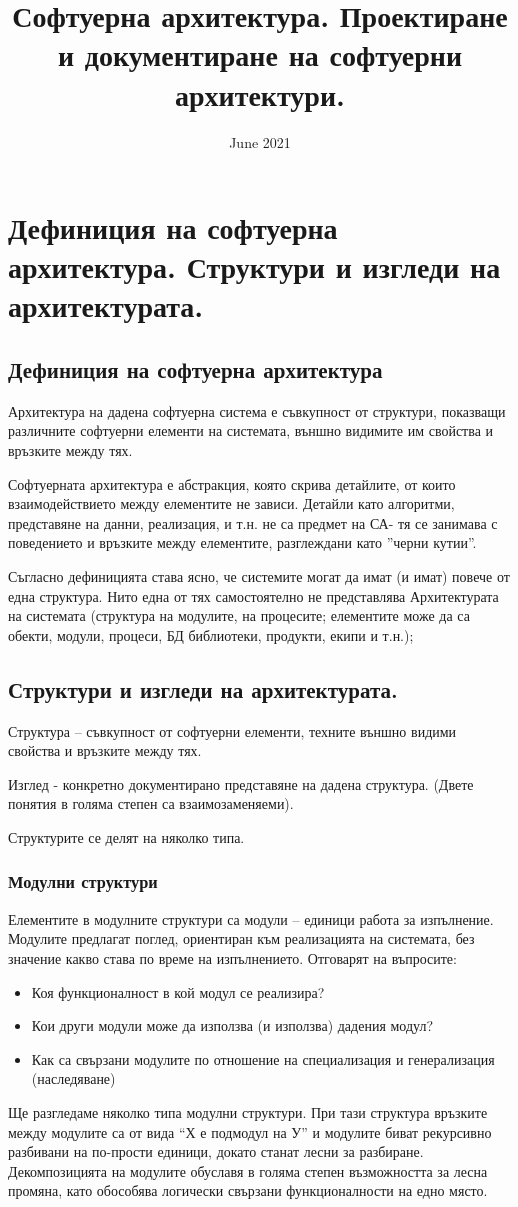 \documentclass[fleqn,12pt]{article}
\title{Софтуерна архитектура. Проектиране и документиране на софтуерни
архитектури.}
\date{June 2021}
\makeatletter
\newcommand\subsubsubsection{\@startsection{paragraph}{4}{\z@}{-2.5ex\@plus -1ex \@minus -.25ex}{1.25ex \@plus .25ex}{\normalfont\normalsize\bfseries}}
\makeatother
\begin{document}
\maketitle

\section{Дефиниция на софтуерна архитектура. Структури и изгледи  на архитектурата.}
\subsection{Дефиниция на софтуерна архитектура}
Архитектура на дадена софтуерна система е съвкупност от структури, показващи различните софтуерни елементи на системата, външно видимите им свойства и връзките между тях.

Софтуерната архитектура е абстракция, която скрива
детайлите, от които взаимодействието между елементите не зависи. Детайли като алгоритми, представяне на данни, реализация, и т.н. не са
предмет на СА- тя се занимава с поведението и връзките между елементите, разглеждани като ''черни кутии''.

Съгласно дефиницията става ясно, че системите могат да имат (и имат)
повече от една структура. Нито една от тях самостоятелно не
представлява Архитектурата на системата (структура на модулите, на
процесите; елементите може да са обекти, модули, процеси, БД
библиотеки, продукти, екипи и т.н.);
\subsection{Структури и изгледи на архитектурата. }
Структура – съвкупност от софтуерни елементи, техните външно видими свойства и връзките между тях.

Изглед - конкретно документирано представяне на дадена структура. (Двете понятия в голяма степен са взаимозаменяеми).

Структурите се делят на няколко типа.
\subsubsection{Модулни структури}
Елементите в модулните структури са модули – единици работа за изпълнение. Модулите предлагат поглед, ориентиран към реализацията на системата, без значение какво става по време на изпълнението.
Отговарят на въпросите:
\begin {itemize}
\item Коя функционалност в кой модул се реализира? 
\item Кои други модули може да използва (и използва) дадения модул? 
\item Как са свързани модулите по отношение на специализация и генерализация (наследяване)
\end {itemize}
Ще разгледаме няколко типа модулни структури.
\subsubsubsection{ Декомпозиция на модулите}
При тази структура връзките между модулите са от вида “Х е подмодул на У” и модулите биват рекурсивно разбивани на по-прости единици, докато станат лесни за разбиране. Декомпозицията на модулите обуславя в голяма степен възможността за лесна промяна, като обособява логически свързани функционалности на едно място.
\end{document}
